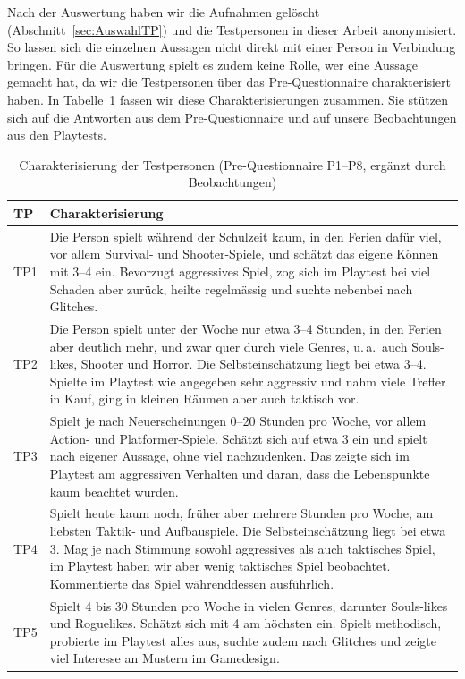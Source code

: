 \documentclass[../Main.tex]{subfiles}
\begin{document}
Nach der Auswertung haben wir die Aufnahmen gelöscht (Abschnitt~\ref{sec:AuswahlTP}) und die Testpersonen in dieser Arbeit anonymisiert. So lassen sich die einzelnen Aussagen nicht direkt mit einer Person in Verbindung bringen. Für die Auswertung spielt es zudem keine Rolle, wer eine Aussage gemacht hat, da wir die Testpersonen über das Pre-Questionnaire charakterisiert haben. In Tabelle~\ref{tab:Testpersonen} fassen wir diese Charakterisierungen zusammen. Sie stützen sich auf die Antworten aus dem Pre-Questionnaire und auf unsere Beobachtungen aus den Playtests.
\begin{table}[H]
    \centering
    \small
    \renewcommand{\arraystretch}{1.3}
    \begin{tabular}{|>{\raggedright\arraybackslash}p{1.2cm}|>{\raggedright\arraybackslash}p{12.6cm}|}
        \hline
        \textbf{TP} & \textbf{Charakterisierung} \\
        \hline
        TP1 & Die Person spielt während der Schulzeit kaum, in den Ferien dafür viel, vor allem Survival- und Shooter-Spiele, und schätzt das eigene Können mit 3--4 ein. Bevorzugt aggressives Spiel, zog sich im Playtest bei viel Schaden aber zurück, heilte regelmässig und suchte nebenbei nach Glitches. \\
        \hline
        TP2 & Die Person spielt unter der Woche nur etwa 3--4 Stunden, in den Ferien aber deutlich mehr, und zwar quer durch viele Genres, u.\,a.\ auch Souls-likes, Shooter und Horror. Die Selbsteinschätzung liegt bei etwa 3--4. Spielte im Playtest wie angegeben sehr aggressiv und nahm viele Treffer in Kauf, ging in kleinen Räumen aber auch taktisch vor. \\
        \hline
        TP3 & Spielt je nach Neuerscheinungen 0--20 Stunden pro Woche, vor allem Action- und Platformer-Spiele. Schätzt sich auf etwa 3 ein und spielt nach eigener Aussage, ohne viel nachzudenken. Das zeigte sich im Playtest am aggressiven Verhalten und daran, dass die Lebenspunkte kaum beachtet wurden. \\
        \hline
        TP4 & Spielt heute kaum noch, früher aber mehrere Stunden pro Woche, am liebsten Taktik- und Aufbauspiele. Die Selbsteinschätzung liegt bei etwa 3. Mag je nach Stimmung sowohl aggressives als auch taktisches Spiel, im Playtest haben wir aber wenig taktisches Spiel beobachtet. Kommentierte das Spiel währenddessen ausführlich. \\
        \hline
        TP5 & Spielt 4 bis 30 Stunden pro Woche in vielen Genres, darunter Souls-likes und Roguelikes. Schätzt sich mit 4 am höchsten ein. Spielt methodisch, probierte im Playtest alles aus, suchte zudem nach Glitches und zeigte viel Interesse an Mustern im Gamedesign. \\
        \hline
    \end{tabular}
    \caption{Charakterisierung der Testpersonen (Pre-Questionnaire P1--P8, ergänzt durch Beobachtungen)}
    \label{tab:Testpersonen}
\end{table}
\end{document}
